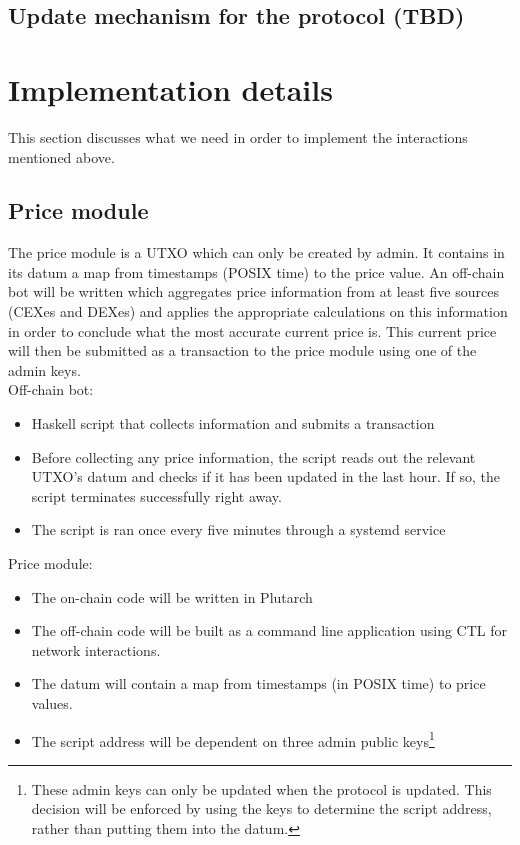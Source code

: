 \documentclass{article} %
\begin{document}
\subsection{Update mechanism for the protocol (TBD)}

\section{Implementation details}

This section discusses what we need in order to implement the interactions
mentioned above.

\subsection{Price module}

The price module is a UTXO which can only be created by admin.
It contains in its datum a map from timestamps (POSIX time) to the price value.
An off-chain bot will be written which aggregates price information from at
least five sources (CEXes and DEXes) and applies the appropriate calculations on
this information in order to conclude what the most accurate current price is.
This current price will then be submitted as a transaction to the price module
using one of the admin keys. \\

Off-chain bot:
\begin{itemize}
  \item Haskell script that collects information and submits a transaction
  \item Before collecting any price information, the script reads out the
    relevant UTXO's datum and checks if it has been updated in the last hour. If
    so, the script terminates successfully right away.
  \item The script is ran once every five minutes through a systemd service
\end{itemize}

Price module:
\begin{itemize}
  \item The on-chain code will be written in Plutarch
  \item The off-chain code will be built as a command line application using
    CTL for network interactions.
  \item The datum will contain a map from timestamps (in POSIX time) to price
    values.
  \item The script address will be dependent on three admin public
    keys\footnote{
      These admin keys can only be updated when the protocol is updated.
      This decision will be enforced by using the keys to determine the script
      address, rather than putting them into the datum.
    }
\end{itemize}
\end{document}

